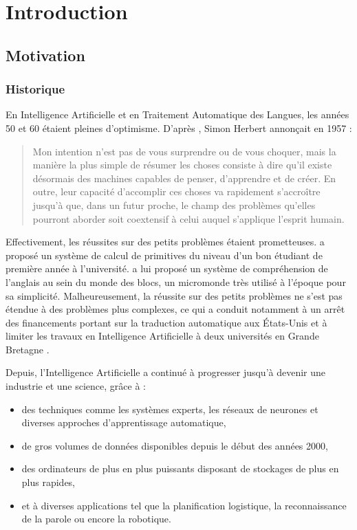 \chapter{Introduction}
\label{ch:intro}

\section{Motivation}

\subsection{Historique}

En Intelligence Artificielle et en Traitement Automatique des Langues, les
années 50 et 60 étaient pleines d'optimisme. D'après
\citep{russell2010artificial}, Simon Herbert annonçait en 1957 :

\begin{quote}
    Mon intention n'est pas de vous surprendre ou de vous choquer, mais la
    manière la plus simple de résumer les choses consiste à dire qu'il existe
    désormais des machines capables de penser, d'apprendre et de créer. En
    outre, leur capacité d'accomplir ces choses va rapidement s'accroître
    jusqu'à que, dans un futur proche, le champ des problèmes qu'elles pourront
    aborder soit coextensif à celui auquel s'applique l'esprit humain.
\end{quote}

Effectivement, les réussites sur des petits problèmes étaient prometteuses.
\cite{slagle1963heuristic} a proposé un système de calcul de primitives du
niveau d'un bon étudiant de première année à l'université.
\cite{winograd1972understanding} a lui proposé un système de compréhension de
l'anglais au sein du monde des blocs, un micromonde très utilisé à l'époque
pour sa simplicité. Malheureusement, la réussite sur des petits problèmes ne
s'est pas étendue à des problèmes plus complexes, ce qui a conduit notamment à
un arrêt des financements portant sur la traduction automatique aux États-Unis
\citep{pierce1966alpac} et à limiter les travaux en Intelligence Artificielle à
deux universités en Grande Bretagne \citep{lighthill1973artificial}.

Depuis, l'Intelligence Artificielle a continué à progresser jusqu'à devenir une
industrie et une science, grâce à :
\begin{itemize}
    \item des techniques comme les systèmes experts, les réseaux de neurones et
        diverses approches d'apprentissage automatique,
    \item de gros volumes de données disponibles depuis le début des années
        2000,
    \item des ordinateurs de plus en plus puissants disposant de stockages de
        plus en plus rapides,
    \item et à diverses applications tel que la planification logistique, la
        reconnaissance de la parole ou encore la robotique.
\end{itemize}

